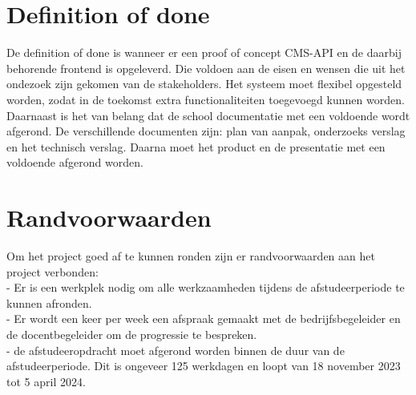 \section{Definition of done}
De definition of done is wanneer er een proof of concept CMS-API en de daarbij behorende frontend is opgeleverd. 
Die voldoen aan de  eisen en wensen die uit het ondezoek zijn gekomen van de stakeholders.
Het systeem moet flexibel opgesteld worden, zodat in de toekomst extra functionaliteiten toegevoegd kunnen worden.
Daarnaast is het van belang dat de school documentatie met een voldoende wordt afgerond.
De verschillende documenten zijn: plan van aanpak, onderzoeks verslag en het technisch verslag.
Daarna moet het product en de presentatie met een voldoende afgerond worden.
\section{Randvoorwaarden}
Om het project goed af te kunnen ronden zijn er randvoorwaarden aan het project verbonden: \\
- Er is een werkplek nodig om alle werkzaamheden tijdens de afstudeerperiode te kunnen afronden.\\
- Er wordt een keer per week een afspraak gemaakt met de bedrijfsbegeleider en de docentbegeleider om de progressie te bespreken. \\ 
- de afstudeeropdracht moet afgerond worden binnen de duur van de afstudeerperiode. 
Dit is ongeveer 125 werkdagen en loopt van 18 november 2023 tot 5 april 2024.
